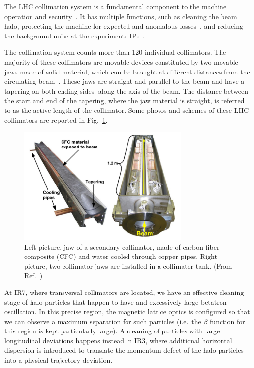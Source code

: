 The LHC collimation system is a fundamental component to the machine operation and security~\cite{1590664, Assmann:972336}. It has multiple functions, such as cleaning the beam halo, protecting the machine for expected and anomalous losses~\cite{BRUCE201719}, and reducing the background noise at the experiments IPs~\cite{Bruce:1646958, Bruce:2686581}.

The collimation system counts more than 120 individual collimators. The majority of these collimators are movable devices constituted by two movable jaws made of solid material, which can be brought at different distances from the circulating beam~\cite{Bertarelli:794628}. These jaws are straight and parallel to the beam and have a tapering on both ending sides, along the axis of the beam. The distance between the start and end of the tapering, where the jaw material is straight, is referred to as the active length of the collimator. Some photos and schemes of these LHC collimators are reported in Fig.~\ref{fig:collimator_pics}.

\begin{figure}[hpt]
    \centering
    \includegraphics[width=0.75\textwidth]{5_Diffusion_measurement_LHC/figs/collimator_pics.png}
    \caption{Left picture, jaw of a secondary collimator, made of carbon-fiber composite (CFC) and water cooled through copper pipes. Right picture, two collimator jaws are installed in a collimator tank. (From Ref.~\cite{bruce2014simulations})}
    \label{fig:collimator_pics}
\end{figure}

At IR7, where transversal collimators are located, we have an effective cleaning stage of halo particles that happen to have and excessively large betatron oscillation. In this precise region, the magnetic lattice optics is configured so that we can observe a maximum separation for such particles (i.e.\ the $\beta$ function for this region is kept particularly large). A cleaning of particles with large longitudinal deviations happens instead in IR3, where additional horizontal dispersion is introduced to translate the momentum defect of the halo particles into a physical trajectory deviation.

